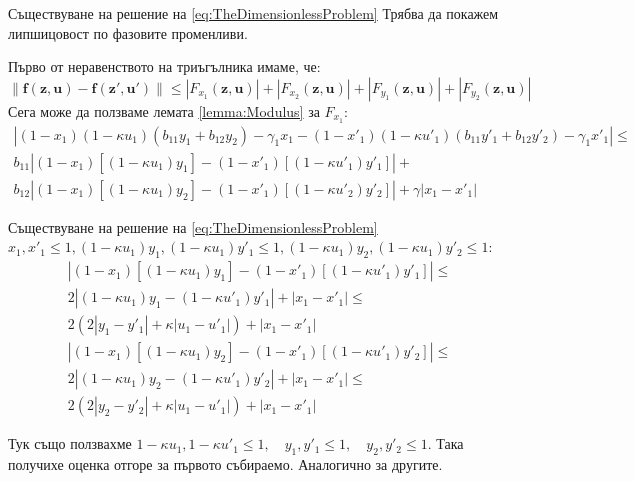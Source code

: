 \begin{frame}[t]{Съществуване на решение на \ref{eq:TheDimensionlessProblem}}
  Трябва да покажем липшицовост по фазовите променливи.

  Първо от неравенството на триъгълника имаме, че:
  \begin{equation}
    \|\boldsymbol{f}(\boldsymbol{z}, \boldsymbol{u}) - \boldsymbol{f}(\boldsymbol{z}', \boldsymbol{u}')\| \leq
    |F_{x_1}(\boldsymbol{z}, \boldsymbol{u})| + |F_{x_2}(\boldsymbol{z}, \boldsymbol{u})| + |F_{y_1}(\boldsymbol{z}, \boldsymbol{u})| + |F_{y_2}(\boldsymbol{z}, \boldsymbol{u})|
  \end{equation}
  Сега може да ползваме лемата \ref{lemma:Modulus} за $F_{x_1}$:
  \begin{multline}
    |(1-x_1) (1-\kappa u_1) \left(b_{11} y_1 + b_{12} y_2\right) - \gamma_1 x_1 - (1-x'_1) (1-\kappa u'_1) \left(b_{11} y'_1 + b_{12} y'_2\right) - \gamma_1 x'_1| \leq \\
    b_{11} \left|(1-x_1)[(1 - \kappa u_1) y_1] -  (1-x'_1)[(1 - \kappa u'_1) y'_1]\right| + \\
    b_{12} \left|(1-x_1)[(1 - \kappa u_1) y_2] -  (1-x'_1)[(1 - \kappa u'_2) y'_2]\right| + \gamma |x_1 - x'_1|
  \end{multline}
\end{frame}

\begin{frame}[t]{Съществуване на решение на \ref{eq:TheDimensionlessProblem}}
  $x_1, x'_1 \leq 1, (1-\kappa u_1)y_1, (1-\kappa u_1) y'_1 \leq 1, (1-\kappa u_1)y_2, (1-\kappa u_1) y'_2 \leq 1$:
  \begin{multline}
    \left|(1-x_1) [(1-\kappa u_1) y_1] - (1-x'_1) [(1-\kappa u'_1) y'_1]\right| \leq \\
    2 |(1-\kappa u_1) y_1 - (1-\kappa u'_1) y'_1| + |x_1 - x'_1| \leq \\
    2 (2|y_1 - y'_1| + \kappa |u_1 - u'_1|) + |x_1 - x'_1|
  \end{multline}
  \begin{multline}
    \left|(1-x_1) [(1-\kappa u_1) y_2] - (1-x'_1) [(1-\kappa u'_1) y'_2]\right| \leq \\
    2 |(1-\kappa u_1) y_2 - (1-\kappa u'_1) y'_2| + |x_1 - x'_1| \leq \\
    2 (2|y_2 - y'_2| + \kappa |u_1 - u'_1|) + |x_1 - x'_1|
  \end{multline}

  Тук също ползвахме $1-\kappa u_1, 1-\kappa u'_1 \leq 1, \quad y_1, y'_1 \leq 1, \quad y_2, y'_2 \leq 1$. Така получихе оценка отгоре за първото събираемо. Аналогично за другите. \\
\end{frame}

